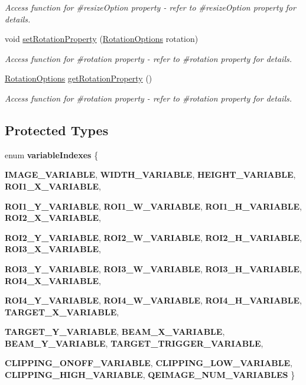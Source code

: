 \begin{DoxyCompactItemize}
\begin{DoxyCompactList}\small\item\em Access function for \#resizeOption property -\/ refer to \#resizeOption property for details. \end{DoxyCompactList}\item 
\hypertarget{classQEImage_a0dedcf0b0a0e658ffe6573706b8f9863}{
void \hyperlink{classQEImage_a0dedcf0b0a0e658ffe6573706b8f9863}{setRotationProperty} (\hyperlink{classQEImage_a91596a1f020e3a40b106dcf82c3b7f9c}{RotationOptions} rotation)}
\label{classQEImage_a0dedcf0b0a0e658ffe6573706b8f9863}

\begin{DoxyCompactList}\small\item\em Access function for \#rotation property -\/ refer to \#rotation property for details. \end{DoxyCompactList}\item 
\hypertarget{classQEImage_a4e21348767e162ecce8ad9bb02dc9cbc}{
\hyperlink{classQEImage_a91596a1f020e3a40b106dcf82c3b7f9c}{RotationOptions} \hyperlink{classQEImage_a4e21348767e162ecce8ad9bb02dc9cbc}{getRotationProperty} ()}
\label{classQEImage_a4e21348767e162ecce8ad9bb02dc9cbc}

\begin{DoxyCompactList}\small\item\em Access function for \#rotation property -\/ refer to \#rotation property for details. \end{DoxyCompactList}\end{DoxyCompactItemize}
\subsection*{Protected Types}
\begin{DoxyCompactItemize}
\item 
enum {\bfseries variableIndexes} \{ \par
{\bfseries IMAGE\_\-VARIABLE}, 
{\bfseries WIDTH\_\-VARIABLE}, 
{\bfseries HEIGHT\_\-VARIABLE}, 
{\bfseries ROI1\_\-X\_\-VARIABLE}, 
\par
{\bfseries ROI1\_\-Y\_\-VARIABLE}, 
{\bfseries ROI1\_\-W\_\-VARIABLE}, 
{\bfseries ROI1\_\-H\_\-VARIABLE}, 
{\bfseries ROI2\_\-X\_\-VARIABLE}, 
\par
{\bfseries ROI2\_\-Y\_\-VARIABLE}, 
{\bfseries ROI2\_\-W\_\-VARIABLE}, 
{\bfseries ROI2\_\-H\_\-VARIABLE}, 
{\bfseries ROI3\_\-X\_\-VARIABLE}, 
\par
{\bfseries ROI3\_\-Y\_\-VARIABLE}, 
{\bfseries ROI3\_\-W\_\-VARIABLE}, 
{\bfseries ROI3\_\-H\_\-VARIABLE}, 
{\bfseries ROI4\_\-X\_\-VARIABLE}, 
\par
{\bfseries ROI4\_\-Y\_\-VARIABLE}, 
{\bfseries ROI4\_\-W\_\-VARIABLE}, 
{\bfseries ROI4\_\-H\_\-VARIABLE}, 
{\bfseries TARGET\_\-X\_\-VARIABLE}, 
\par
{\bfseries TARGET\_\-Y\_\-VARIABLE}, 
{\bfseries BEAM\_\-X\_\-VARIABLE}, 
{\bfseries BEAM\_\-Y\_\-VARIABLE}, 
{\bfseries TARGET\_\-TRIGGER\_\-VARIABLE}, 
\par
{\bfseries CLIPPING\_\-ONOFF\_\-VARIABLE}, 
{\bfseries CLIPPING\_\-LOW\_\-VARIABLE}, 
{\bfseries CLIPPING\_\-HIGH\_\-VARIABLE}, 
{\bfseries QEIMAGE\_\-NUM\_\-VARIABLES}
 \}
\end{DoxyCompactItemize}
